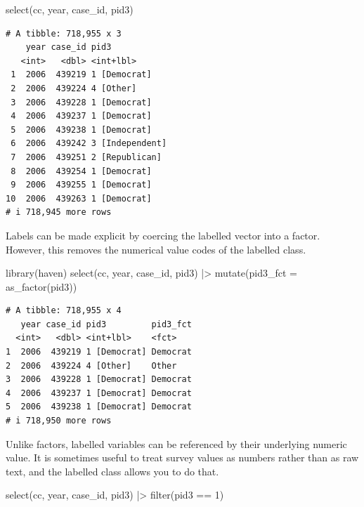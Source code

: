 \documentclass[10pt,article,oneside]{memoir}
\newenvironment{Shaded}{\begin{snugshade}}{\end{snugshade}}
\newcommand{\AttributeTok}[1]{\textcolor[rgb]{0.40,0.45,0.13}{#1}}
\newcommand{\DecValTok}[1]{\textcolor[rgb]{0.68,0.00,0.00}{#1}}
\newcommand{\FunctionTok}[1]{\textcolor[rgb]{0.28,0.35,0.67}{#1}}
\newcommand{\NormalTok}[1]{\textcolor[rgb]{0.00,0.23,0.31}{#1}}
\newcommand{\SpecialCharTok}[1]{\textcolor[rgb]{0.37,0.37,0.37}{#1}}
\begin{document}
\begin{Shaded}
\begin{Highlighting}[]
\FunctionTok{select}\NormalTok{(cc, year, case\_id, pid3)}
\end{Highlighting}
\end{Shaded}

\begin{verbatim}
# A tibble: 718,955 x 3
    year case_id pid3           
   <int>   <dbl> <int+lbl>      
 1  2006  439219 1 [Democrat]   
 2  2006  439224 4 [Other]      
 3  2006  439228 1 [Democrat]   
 4  2006  439237 1 [Democrat]   
 5  2006  439238 1 [Democrat]   
 6  2006  439242 3 [Independent]
 7  2006  439251 2 [Republican] 
 8  2006  439254 1 [Democrat]   
 9  2006  439255 1 [Democrat]   
10  2006  439263 1 [Democrat]   
# i 718,945 more rows
\end{verbatim}

\noindent Labels can be made explicit by coercing the labelled vector
into a factor. However, this removes the numerical value codes of the
labelled class.

\begin{Shaded}
\begin{Highlighting}[]
\FunctionTok{library}\NormalTok{(haven)}
\FunctionTok{select}\NormalTok{(cc, year, case\_id, pid3) }\SpecialCharTok{|\textgreater{}} 
  \FunctionTok{mutate}\NormalTok{(}\AttributeTok{pid3\_fct =} \FunctionTok{as\_factor}\NormalTok{(pid3))}
\end{Highlighting}
\end{Shaded}

\begin{verbatim}
# A tibble: 718,955 x 4
   year case_id pid3         pid3_fct
  <int>   <dbl> <int+lbl>    <fct>   
1  2006  439219 1 [Democrat] Democrat
2  2006  439224 4 [Other]    Other   
3  2006  439228 1 [Democrat] Democrat
4  2006  439237 1 [Democrat] Democrat
5  2006  439238 1 [Democrat] Democrat
# i 718,950 more rows
\end{verbatim}

\noindent Unlike factors, labelled variables can be referenced by their
underlying numeric value. It is sometimes useful to treat survey values
as numbers rather than as raw text, and the labelled class allows you to
do that.

\begin{Shaded}
\begin{Highlighting}[]
\FunctionTok{select}\NormalTok{(cc, year, case\_id, pid3) }\SpecialCharTok{|\textgreater{}} 
  \FunctionTok{filter}\NormalTok{(pid3 }\SpecialCharTok{==} \DecValTok{1}\NormalTok{)}
\end{Highlighting}
\end{Shaded}
\end{document}
